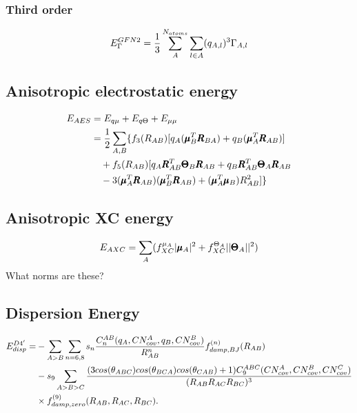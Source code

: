 \subsubsection{Third order}
\begin{equation}
    \E{\Gamma}^{GFN2} = \frac{1}{3}\sum_A^{N_{atoms}}\sum_{l\in A}(q_{A,l})^3\Gamma_{A,l}
\end{equation}
\subsection{Anisotropic electrostatic energy}
\begin{equation}
\begin{split}
    \E{AES} &= \E{q\mu}+\E{q\Theta} + \E{\mu\mu}\\
    &= \frac{1}{2}\sum_{A,B}\{f_3(R_{AB})[q_A(\pmb{\mu}_B^T\pmb{R}_{BA})+q_B(\pmb{\mu}_A^T\pmb{R}_{AB})]\\
    &\quad + f_5(R_{AB})[q_A\pmb{R}_{AB}^T\pmb{\Theta}_B\pmb{R}_{AB}+q_B\pmb{R}_{AB}^T\pmb{\Theta}_A\pmb{R}_{AB}\\
    &\quad -3(\pmb{\mu}_A^T\pmb{R}_{AB})(\pmb{\mu}_B^T\pmb{R}_{AB}) + (\pmb{\mu}_A^T\pmb{\mu}_B)R_{AB}^2] \}\\
\end{split}
\end{equation}



\subsection{Anisotropic XC energy}
\begin{equation}
    \E{AXC} = \sum_A (f^{\mu_A}_{XC}|\pmb{\mu}_A|^2 + f^{\Theta_A}_{XC}||\pmb{\Theta}_A||^2)
\end{equation}
What norms are these?

\newpage

\subsection{Dispersion Energy}
\begin{equation}
\begin{split}
  \E{disp}^{D4'} = &-\sum_{A>B} \sum_{n=6,8} s_n \frac{C_n^{AB} (q_A, CN^A_{cov}, q_B, CN^B_{cov})}{R^n_{AB}} f^{(n)}_{damp,BJ} (R_{AB}) \\
  &-s_9 \sum_{A>B>C} \frac{(3cos(\theta_{ABC})cos(\theta_{BCA})cos(\theta_{CAB})+1)C_9^{ABC}(CN_{cov}^A,CN_{cov}^B,CN_{cov}^C)}{(R_{AB} R_{AC} R_{BC})^3} \\
  &\times f^{(9)}_{damp,zero}(R_{AB},R_{AC},R_{BC}).
\end{split}
\end{equation}

